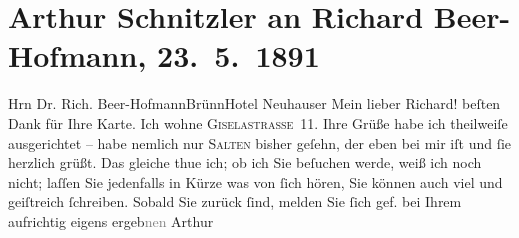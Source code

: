 

         
         \renewcommand{\erwaehntePersonen}{Personen: Richard Beer-Hofmann, Felix Salten}
         \renewcommand{\erwaehnteOrte}{Orte: Brünn, Bösendorferstraße, Hotel Neuhauser, Wien}
         \renewcommand{\erwaehnteWerke}{}
               \section[Arthur Schnitzler an Richard Beer-Hofmann, 23. 5. 1891]{ Arthur Schnitzler an Richard Beer-Hofmann, 23. 5. 1891}\nopagebreak{}\rehead{ }\begin{ledgroupsized}[t]{13cm}\normalsize\beginnumbering \toendnotes[C]{\smallbreak\pagebreak[2]} 
\pstart{}{\pb}Hrn Dr. Rich. Beer-Hofmann\pend{}\pstart{}Brünn\pend{}\pstart{}Hotel Neuhauser\pend{}{\bigskip}\pstart
           \noindent{}{\pb}Mein lieber Richard!\pend
           \pstart
           beſten Dank für Ihre Karte. Ich wohne \textsc{Giselastraße 11}. Ihre Grüße habe ich theilweiſe ausgerichtet – habe nemlich nur \textsc{Salten} bisher geſehn, der eben bei mir {\pb}iſt und
               ſie herzlich grüßt.\pend
           \pstart
           Das gleiche thue ich; ob ich Sie beſuchen werde, weiß ich noch nicht; laſſen Sie
               jedenfalls in Kürze was von ſich hören, Sie können auch viel und geiſtreich
               ſchreiben. Sobald Sie zurück ſind, melden Sie ſich gef. bei Ihrem aufrichtig eigens
                  ergeb\textcolor{gray}{nen}\pend
           \pstart \spacefill\mbox{Arthur}\pend{}
         
         \endnumbering{}\end{ledgroupsized}  \newcommand{\dateiname}{L00015}\newcommand{\titel}{Arthur Schnitzler an Richard Beer-Hofmann, 23. 5. 1891}\newcommand{\editorInnen}{Martin Anton Müller und Gerd-Hermann Susen}
      